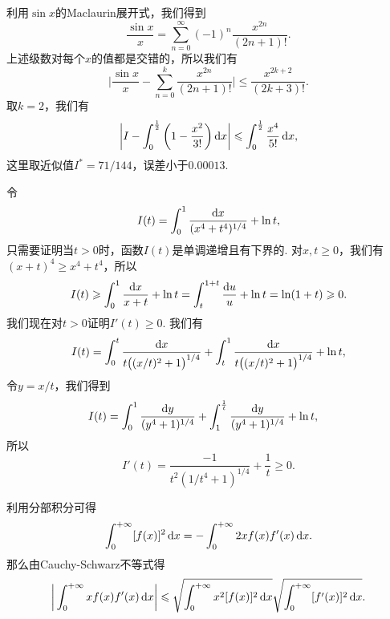 \begin{ans}
  利用$\sin x$的Maclaurin展开式，我们得到
  \[
    \frac{\sin x}x=\sum_{n=0}^\infty(-1)^n\frac{x^{2n}}{(2n+1)!}.
  \]
  上述级数对每个$x$的值都是交错的，所以我们有
  \[
    \bigg|\frac{\sin x}x-\sum_{n=0}^k\frac{x^{2n}}{(2n+1)!}\bigg|
    \le \frac{x^{2k+2}}{(2k+3)!}.
  \]
  取$k=2$，我们有
  \[
    \bigg| I-\int_0^{\frac12}\bigg(1-\frac{x^2}{3!}\bigg)\,\mathrm dx\bigg|
    \leqslant\int_0^{\frac12}\frac{x^4}{5!}\,\mathrm dx,
  \]
  这里取近似值$I^\ast=71/144$，误差小于$0.00013$.
\end{ans}

\begin{ans}
  令
  \[
    I(t) =\int_0^1\frac{\mathrm dx}{(x^4+t^4)^{1/4}} + \ln t,
  \]
  只需要证明当$t>0$时，函数$I(t)$是单调递增且有下界的. 对$x,t\ge0$，我们有$(x+t)^4\ge x^4+t^4$，所以
  \[
    I(t)\geqslant\int_0^1\frac{\mathrm dx}{x+t}+\ln t =
    \int_t^{1+t}\frac{\mathrm du}u +\ln t
    =\ln(1+t)\geqslant0.
  \]
  我们现在对$t>0$证明$I'(t)\ge0$. 我们有
  \[
    I(t)=\int_0^t\frac{\mathrm dx}{t\big((x/t)^2+1\big)^{1/4}}
    +\int_t^1\frac{\mathrm dx}{t\big((x/t)^2+1\big)^{1/4}}
    +\ln t,
  \]
  令$y=x/t$，我们得到
  \begin{align*}
    I(t) & =\int_0^1\frac{\mathrm dy}{(y^4+1)^{1/4}}
    +\int_1^{\frac1t}\frac{\mathrm dy}{(y^4+1)^{1/4}}+\ln t,
  \end{align*}
  所以
  \[
    I'(t) = \frac{-1}{t^2(1/t^4+1)^{1/4}} +\frac1t\ge0.
  \]
\end{ans}

\begin{ans}
  利用分部积分可得
  \[
    \int_0^{+\infty}[f(x)]^2\,\mathrm dx = -\int_0^{+\infty}2xf(x)f'(x)\,\mathrm dx.
  \]
  那么由Cauchy-Schwarz不等式得
  \[
    \bigg| \int_0^{+\infty}xf(x)f'(x)\,\mathrm dx \bigg|
    \leqslant\sqrt{\int_0^{+\infty}x^2[f(x)]^2\,\mathrm dx}
    \sqrt{\int_0^{+\infty}[f'(x)]^2\,\mathrm dx}.
  \]
\end{ans}

